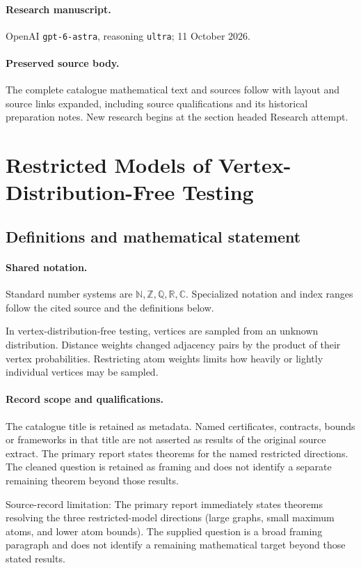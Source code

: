 \documentclass[11pt]{article}
\begin{document}
\paragraph{Research manuscript.} OpenAI \texttt{gpt-6-astra}, reasoning \texttt{ultra}; 11 October 2026.
\paragraph{Preserved source body.} The complete catalogue mathematical text and sources follow with layout and source links expanded, including source qualifications and its historical preparation notes. New research begins at the section headed Research attempt.

\section{Restricted Models of Vertex-Distribution-Free Testing}\label{statement}

\subsection{Definitions and mathematical statement}

\paragraph{Shared notation.}Standard number systems are $\mathbb N,\mathbb Z,\mathbb Q,\mathbb R,\mathbb C$. Specialized notation and index ranges follow the cited source and the definitions below.


In vertex-distribution-free testing, vertices are sampled from an unknown distribution. Distance weights changed adjacency pairs by the product of their vertex probabilities. Restricting atom weights limits how heavily or lightly individual vertices may be sampled.
\paragraph{Record scope and qualifications.}
The catalogue title is retained as metadata. Named certificates, contracts, bounds or frameworks in that title are not asserted as results of the original source extract.
The primary report states theorems for the named restricted directions. The cleaned question is retained as framing and does not identify a separate remaining theorem beyond those results.

Source-record limitation: The primary report immediately states theorems resolving the three restricted-model directions (large graphs, small maximum atoms, and lower atom bounds). The supplied question is a broad framing paragraph and does not identify a remaining mathematical target beyond those stated results.
\end{document}
